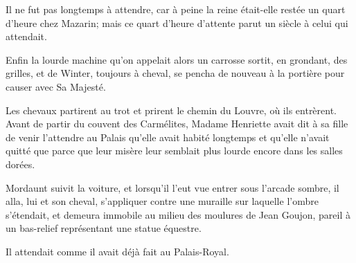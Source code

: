 Il ne fut pas longtemps à attendre, car à peine la reine était-elle restée un quart d'heure chez Mazarin; mais ce quart d'heure d'attente parut un siècle à celui qui attendait.

Enfin la lourde machine qu'on appelait alors un carrosse sortit, en grondant, des grilles, et de Winter, toujours à cheval, se pencha de nouveau à la portière pour causer avec Sa Majesté.

Les chevaux partirent au trot et prirent le chemin du Louvre, où ils entrèrent. Avant de partir du couvent des Carmélites, Madame Henriette avait dit à sa fille de venir l'attendre au Palais qu'elle avait habité longtemps et qu'elle n'avait quitté que parce que leur misère leur semblait plus lourde encore dans les salles dorées.

Mordaunt suivit la voiture, et lorsqu'il l'eut vue entrer sous l'arcade sombre, il alla, lui et son cheval, s'appliquer contre une muraille sur laquelle l'ombre s'étendait, et demeura immobile au milieu des moulures de Jean Goujon, pareil à un bas-relief représentant une statue équestre.

Il attendait comme il avait déjà fait au Palais-Royal.